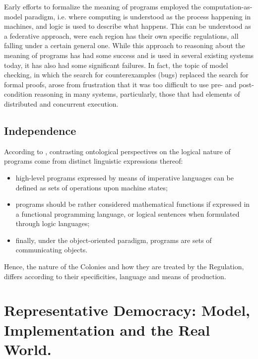 \documentclass[]{article}
\begin{document}
Early efforts to formalize the meaning of programs employed the
computation-as-model paradigm, i.e. where computing is understood as the process happening in machines, and logic is used to describe what happens. This can be understood as a federative approach, were each region has their own specific regulations, all falling under a certain general one. 
While this approach to reasoning about the meaning of programs has had
some success and is used in several existing systems today, it has
also had some significant failures. In fact, the topic of model
checking, in which the search for counterexamples (bugs) replaced the
search for formal proofs, arose from frustration that it was too
difficult to use pre- and post-condition reasoning in many systems,
particularly, those that had elements of distributed and concurrent execution.






\subsection{Independence}



{\color{red}{this passage is inspired by Nicola's note}}

According to \cite{turner2018}, contrasting ontological perspectives on the logical nature of programs come from distinct linguistic expressions thereof: 

\begin{itemize}
	\item  high-level programs expressed by means of imperative languages can be defined as sets of operations upon machine states;
	\item  programs should be rather considered mathematical functions if expressed in a functional programming language, or logical sentences when formulated
	through logic languages; 
	\item finally, under the object-oriented paradigm, programs are sets of
	communicating objects. 
\end{itemize}
%
Hence, the nature of the Colonies and how they are treated by the Regulation, differs according to their specificities, language and means of production. 





\section{Representative Democracy: Model, Implementation and the Real World.}
\end{document}
